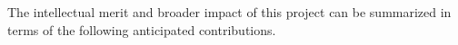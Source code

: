 



The intellectual merit and broader impact of this project can be summarized
in terms of the following anticipated contributions.

